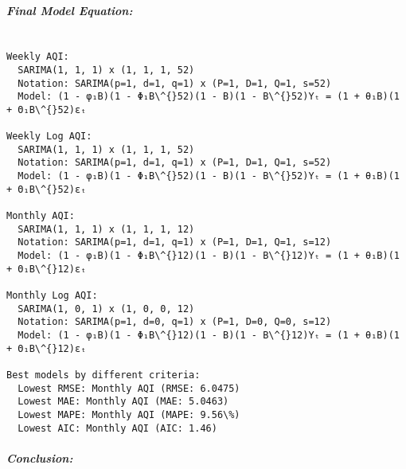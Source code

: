 \documentclass[11pt, twocolumn]{article}
\begin{document}
    \subparagraph{Final Model Equation:}\label{final-model-equation}

    \begin{Verbatim}[commandchars=\\\{\}]

Weekly AQI:
  SARIMA(1, 1, 1) x (1, 1, 1, 52)
  Notation: SARIMA(p=1, d=1, q=1) x (P=1, D=1, Q=1, s=52)
  Model: (1 - φ₁B)(1 - Φ₁B\^{}52)(1 - B)(1 - B\^{}52)Yₜ = (1 + θ₁B)(1 + Θ₁B\^{}52)εₜ

Weekly Log AQI:
  SARIMA(1, 1, 1) x (1, 1, 1, 52)
  Notation: SARIMA(p=1, d=1, q=1) x (P=1, D=1, Q=1, s=52)
  Model: (1 - φ₁B)(1 - Φ₁B\^{}52)(1 - B)(1 - B\^{}52)Yₜ = (1 + θ₁B)(1 + Θ₁B\^{}52)εₜ

Monthly AQI:
  SARIMA(1, 1, 1) x (1, 1, 1, 12)
  Notation: SARIMA(p=1, d=1, q=1) x (P=1, D=1, Q=1, s=12)
  Model: (1 - φ₁B)(1 - Φ₁B\^{}12)(1 - B)(1 - B\^{}12)Yₜ = (1 + θ₁B)(1 + Θ₁B\^{}12)εₜ

Monthly Log AQI:
  SARIMA(1, 0, 1) x (1, 0, 0, 12)
  Notation: SARIMA(p=1, d=0, q=1) x (P=1, D=0, Q=0, s=12)
  Model: (1 - φ₁B)(1 - Φ₁B\^{}12)(1 - B)(1 - B\^{}12)Yₜ = (1 + θ₁B)(1 + Θ₁B\^{}12)εₜ

Best models by different criteria:
  Lowest RMSE: Monthly AQI (RMSE: 6.0475)
  Lowest MAE: Monthly AQI (MAE: 5.0463)
  Lowest MAPE: Monthly AQI (MAPE: 9.56\%)
  Lowest AIC: Monthly AQI (AIC: 1.46)
    \end{Verbatim}

    \subparagraph{Conclusion:}\label{conclusion}


    
    
    
\end{document}

